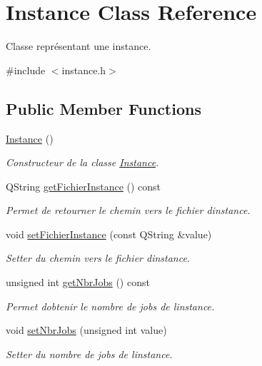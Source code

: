 \hypertarget{classInstance}{}\section{Instance Class Reference}
\label{classInstance}


Classe représentant une instance.  




{\ttfamily \#include $<$instance.\+h$>$}

\subsection*{Public Member Functions}
\begin{DoxyCompactItemize}
\item 
\hyperlink{classInstance_a399506c7e75ab9ab78fbc34a25932bbd}{Instance} ()
\begin{DoxyCompactList}\small\item\em Constructeur de la classe \hyperlink{classInstance}{Instance}. \end{DoxyCompactList}\item 
Q\+String \hyperlink{classInstance_a783365375cdab53149f87208374331a7}{get\+Fichier\+Instance} () const
\begin{DoxyCompactList}\small\item\em Permet de retourner le chemin vers le fichier d\textquotesingle{}instance. \end{DoxyCompactList}\item 
void \hyperlink{classInstance_a263461a7a8c44c9e7080620a30cc8fcf}{set\+Fichier\+Instance} (const Q\+String \&value)
\begin{DoxyCompactList}\small\item\em Setter du chemin vers le fichier d\textquotesingle{}instance. \end{DoxyCompactList}\item 
unsigned int \hyperlink{classInstance_a1ed694b05c888cdb177ddf4c92a482d9}{get\+Nbr\+Jobs} () const
\begin{DoxyCompactList}\small\item\em Permet d\textquotesingle{}obtenir le nombre de jobs de l\textquotesingle{}instance. \end{DoxyCompactList}\item 
void \hyperlink{classInstance_ade6c7b12ee34960cebb060d669ec8f06}{set\+Nbr\+Jobs} (unsigned int value)
\begin{DoxyCompactList}\small\item\em Setter du nombre de jobs de l\textquotesingle{}instance. \end{DoxyCompactList}\item 

\end{DoxyCompactItemize}
